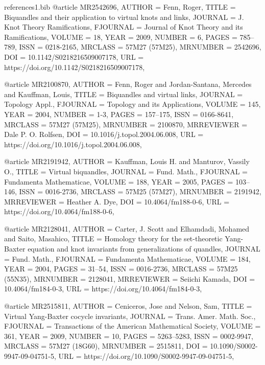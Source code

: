\documentclass[11pt, reqno]{amsart}
\theoremstyle{definition}
\begin{document}
\begin{filecontents*}[overwrite]{references1.bib}
@article {MR2542696,
    AUTHOR = {Fenn, Roger},
     TITLE = {Biquandles and their application to virtual knots and links},
   JOURNAL = {J. Knot Theory Ramifications},
  FJOURNAL = {Journal of Knot Theory and its Ramifications},
    VOLUME = {18},
      YEAR = {2009},
    NUMBER = {6},
     PAGES = {785--789},
      ISSN = {0218-2165},
   MRCLASS = {57M27 (57M25)},
  MRNUMBER = {2542696},
       DOI = {10.1142/S0218216509007178},
       URL = {https://doi.org/10.1142/S0218216509007178},
}

@article {MR2100870,
    AUTHOR = {Fenn, Roger and Jordan-Santana, Mercedes and Kauffman, Louis},
     TITLE = {Biquandles and virtual links},
   JOURNAL = {Topology Appl.},
  FJOURNAL = {Topology and its Applications},
    VOLUME = {145},
      YEAR = {2004},
    NUMBER = {1-3},
     PAGES = {157--175},
      ISSN = {0166-8641},
   MRCLASS = {57M27 (57M25)},
  MRNUMBER = {2100870},
MRREVIEWER = {Dale P. O. Rolfsen},
       DOI = {10.1016/j.topol.2004.06.008},
       URL = {https://doi.org/10.1016/j.topol.2004.06.008},
}

 
@article {MR2191942,
    AUTHOR = {Kauffman, Louis H. and Manturov, Vassily O.},
     TITLE = {Virtual biquandles},
   JOURNAL = {Fund. Math.},
  FJOURNAL = {Fundamenta Mathematicae},
    VOLUME = {188},
      YEAR = {2005},
     PAGES = {103--146},
      ISSN = {0016-2736},
   MRCLASS = {57M25 (57M27)},
  MRNUMBER = {2191942},
MRREVIEWER = {Heather A. Dye},
       DOI = {10.4064/fm188-0-6},
       URL = {https://doi.org/10.4064/fm188-0-6},
}


@article {MR2128041,
    AUTHOR = {Carter, J. Scott and Elhamdadi, Mohamed and Saito, Masahico},
     TITLE = {Homology theory for the set-theoretic {Y}ang-{B}axter equation
              and knot invariants from generalizations of quandles},
   JOURNAL = {Fund. Math.},
  FJOURNAL = {Fundamenta Mathematicae},
    VOLUME = {184},
      YEAR = {2004},
     PAGES = {31--54},
      ISSN = {0016-2736},
   MRCLASS = {57M25 (55N35)},
  MRNUMBER = {2128041},
MRREVIEWER = {Seiichi Kamada},
       DOI = {10.4064/fm184-0-3},
       URL = {https://doi.org/10.4064/fm184-0-3},
}


@article {MR2515811,
    AUTHOR = {Ceniceros, Jose and Nelson, Sam},
     TITLE = {Virtual {Y}ang-{B}axter cocycle invariants},
   JOURNAL = {Trans. Amer. Math. Soc.},
  FJOURNAL = {Transactions of the American Mathematical Society},
    VOLUME = {361},
      YEAR = {2009},
    NUMBER = {10},
     PAGES = {5263--5283},
      ISSN = {0002-9947},
   MRCLASS = {57M27 (18G60)},
  MRNUMBER = {2515811},
       DOI = {10.1090/S0002-9947-09-04751-5},
       URL = {https://doi.org/10.1090/S0002-9947-09-04751-5},
}


\end{filecontents*}
\end{document}
